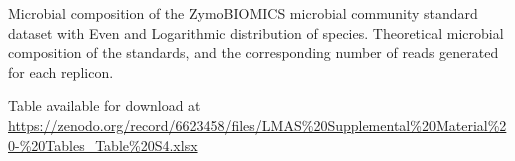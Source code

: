 \begin{table}[]
\centering
\caption{Microbial composition of the ZymoBIOMICS microbial community standard dataset with Even and Logarithmic distribution of species. Theoretical microbial composition of the standards, and the corresponding number of reads generated for each replicon.}
\label{tab:ch5_suptable4}
Table available for download at \url{https://zenodo.org/record/6623458/files/LMAS\%20Supplemental\%20Material\%20-\%20Tables_Table\%20S4.xlsx}
\end{table}
